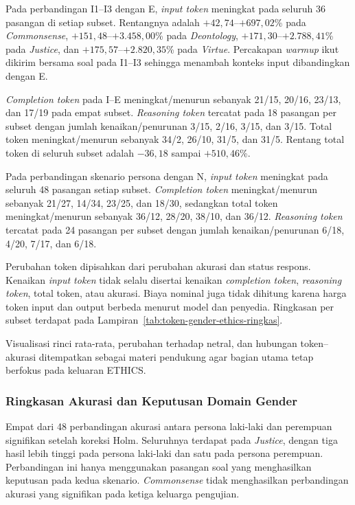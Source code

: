 Pada perbandingan I1--I3 dengan E, \textit{input token} meningkat pada seluruh
36 pasangan di setiap subset. Rentangnya adalah $+42{,}74$--$+697{,}02$\% pada
\textit{Commonsense}, $+151{,}48$--$+3.458{,}00$\% pada \textit{Deontology},
$+171{,}30$--$+2.788{,}41$\% pada \textit{Justice}, dan
$+175{,}57$--$+2.820{,}35$\% pada \textit{Virtue}. Percakapan
\textit{warmup} ikut dikirim bersama soal pada I1--I3 sehingga menambah konteks
input dibandingkan dengan E.

\textit{Completion token} pada I--E meningkat/menurun sebanyak 21/15, 20/16,
23/13, dan 17/19 pada empat subset. \textit{Reasoning token} tercatat pada 18
pasangan per subset dengan jumlah kenaikan/penurunan 3/15, 2/16, 3/15, dan
3/15. Total token meningkat/menurun sebanyak 34/2, 26/10, 31/5, dan 31/5.
Rentang total token di seluruh subset adalah $-36{,}18$ sampai $+510{,}46$\%.

Pada perbandingan skenario persona dengan N, \textit{input token} meningkat
pada seluruh 48 pasangan setiap subset. \textit{Completion token}
meningkat/menurun sebanyak 21/27, 14/34, 23/25, dan 18/30, sedangkan total token
meningkat/menurun sebanyak 36/12, 28/20, 38/10, dan 36/12. \textit{Reasoning
token} tercatat pada 24 pasangan per subset dengan jumlah kenaikan/penurunan
6/18, 4/20, 7/17, dan 6/18.

Perubahan token dipisahkan dari perubahan akurasi dan status respons. Kenaikan
\textit{input token} tidak selalu disertai kenaikan \textit{completion token},
\textit{reasoning token}, total token, atau akurasi. Biaya nominal juga tidak
dihitung karena harga token input dan output berbeda menurut model dan
penyedia. Ringkasan per subset terdapat pada
Lampiran~\ref{tab:token-gender-ethics-ringkas}.

Visualisasi rinci rata-rata, perubahan terhadap netral, dan hubungan
token--akurasi ditempatkan sebagai materi pendukung agar bagian utama tetap
berfokus pada keluaran ETHICS.

\subsubsection{Ringkasan Akurasi dan Keputusan Domain Gender}
\label{subsubsec:ringkasan-akurasi-gender-ethics}

Empat dari 48 perbandingan akurasi antara persona laki-laki dan perempuan
signifikan setelah koreksi Holm. Seluruhnya terdapat pada \textit{Justice},
dengan tiga hasil lebih tinggi pada persona laki-laki dan satu pada persona
perempuan. Perbandingan ini hanya menggunakan pasangan soal yang menghasilkan
keputusan pada kedua skenario. \textit{Commonsense} tidak menghasilkan
perbandingan akurasi yang signifikan pada ketiga keluarga pengujian.

